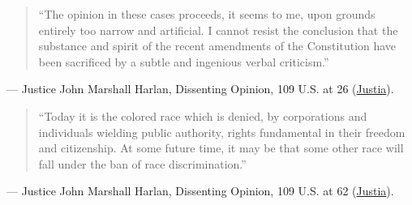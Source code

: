 \documentclass[12pt]{article}
\begin{document}
\begin{quote}
``The opinion in these cases proceeds, it seems to me, upon grounds entirely too narrow and artificial. I cannot resist the conclusion that the substance and spirit of the recent amendments of the Constitution have been sacrificed by a subtle and ingenious verbal criticism.''
\end{quote}
\noindent --- Justice John Marshall Harlan, Dissenting Opinion, 109 U.S. at 26 (\href{https://supreme.justia.com/cases/federal/us/109/3/}{Justia}).

\begin{quote}
``Today it is the colored race which is denied, by corporations and individuals wielding public authority, rights fundamental in their freedom and citizenship. At some future time, it may be that some other race will fall under the ban of race discrimination.''
\end{quote}
\noindent --- Justice John Marshall Harlan, Dissenting Opinion, 109 U.S. at 62 (\href{https://supreme.justia.com/cases/federal/us/109/3/}{Justia}).
\end{document}

